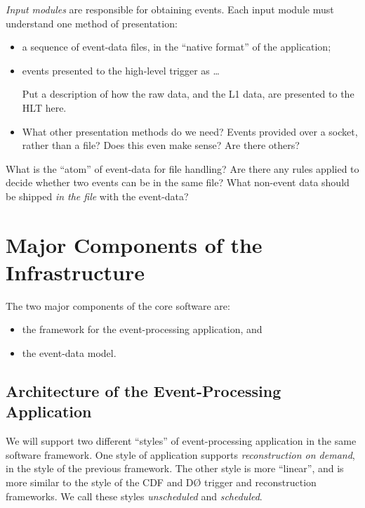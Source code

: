 \documentclass[draftmode]{memarticle}
\newcommand{\Orca}{\productname{Orca}}
\newcommand{\DO}{D\O\xspace}
\begin{document}
\emph{Input modules} are responsible for obtaining events.
Each input module must understand one method of presentation:
\begin{itemize}
\item a sequence of event-data files, in the ``native format'' of the
application;
\item events presented to the high-level trigger as \ldots
\begin{fixme}
Put a description of how the raw data,
and the L1 data,
are presented to the HLT here.
\end{fixme}
\item
\begin{fixme}
What other presentation methods do we need? Events provided over a socket,
rather than a file? Does this even make sense? Are there others?
\end{fixme}
\end{itemize}

\begin{fixme}
What is the ``atom'' of event-data for file handling?
Are there any rules applied to decide whether two events can be in the same file?
What non-event data should be shipped \emph{in the file} with the event-data?
\end{fixme}

\section{Major Components of the Infrastructure}

The two major components of the core software are:
\begin{itemize}
\item the framework for the event-processing application, and
\item the event-data model.
\end{itemize}

\subsection{Architecture of the Event-Processing Application}

We will support two different ``styles'' of event-processing application
in the same software framework.
One style of application supports \emph{reconstruction on demand},
in the style of the previous \Orca framework.
The other style is more ``linear'',
and is more similar to the style
of the CDF and \DO
trigger and reconstruction frameworks.
We call these styles \emph{unscheduled} and \emph{scheduled}.
\end{document}

